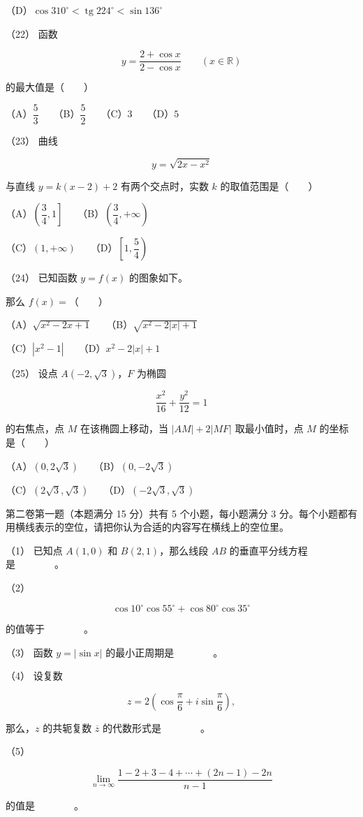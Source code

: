 \begin{question}
（D）$\cos310^\circ<\operatorname{tg}224^\circ<\sin136^\circ$

（22） 函数

\nopagebreak[4]
\[
y=\frac{2+\cos x}{2-\cos x}\qquad(x\in\mathbb R)
\]

的最大值是\mbox{（　　）}

（A）$\dfrac53$　　（B）$\dfrac52$　　（C）$3$　　（D）$5$

（23） 曲线

\nopagebreak[4]
\[
y=\sqrt{2x-x^2}
\]

与直线 $y=k(x-2)+2$ 有两个交点时，实数 $k$ 的取值范围是\mbox{（　　）}

（A）$\left(\dfrac34,1\right]$　　（B）$\left(\dfrac34,+\infty\right)$

（C）$(1,+\infty)$　　（D）$\left[1,\dfrac54\right)$

（24） 已知函数 $y=f(x)$ 的图象如下。
\nopagebreak[4]
\begin{center}\end{center}
\nopagebreak[4]
那么 $f(x)=$\mbox{（　　）}

（A）$\sqrt{x^2-2x+1}$　　（B）$\sqrt{x^2-2|x|+1}$

（C）$|x^2-1|$　　（D）$x^2-2|x|+1$

（25） 设点 $A(-2,\sqrt3)$，$F$ 为椭圆

\nopagebreak[4]
\[
\frac{x^2}{16}+\frac{y^2}{12}=1
\]

的右焦点，点 $M$ 在该椭圆上移动，当 $|AM|+2|MF|$ 取最小值时，点 $M$ 的坐标是\mbox{（　　）}

（A）$(0,2\sqrt3)$　　（B）$(0,-2\sqrt3)$

（C）$(2\sqrt3,\sqrt3)$　　（D）$(-2\sqrt3,\sqrt3)$

\end{question}
\begin{question}

第二卷第一题（本题满分 15 分）共有 5 个小题，每小题满分 3 分。每个小题都有用横线表示的空位，请把你认为合适的内容写在横线上的空位里。

（1） 已知点 $A(1,0)$ 和 $B(2,1)$，那么线段 $AB$ 的垂直平分线方程是　　　　。

（2）　

\nopagebreak[4]
\[
\cos10^\circ\cos55^\circ+\cos80^\circ\cos35^\circ
\]

的值等于　　　　。

（3） 函数 $y=|\sin x|$ 的最小正周期是　　　　。

（4） 设复数

\nopagebreak[4]
\[
z=2\left(\cos\frac\pi6+i\sin\frac\pi6\right),
\]

那么，$z$ 的共轭复数 $\overline z$ 的代数形式是　　　　。

（5）　

\nopagebreak[4]
\[
\lim_{n\to\infty}
\frac{1-2+3-4+\cdots+(2n-1)-2n}{n-1}
\]

的值是　　　　。

\end{question}
